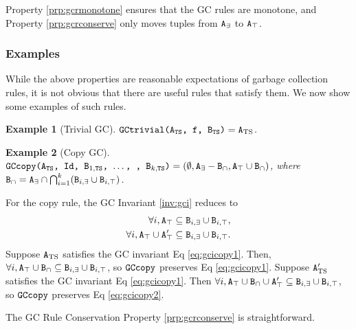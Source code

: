 \documentclass[10pt]{proc}
\numberwithin{equation}{section}
\newtheorem{example}{Example}[section]
\renewcommand{\tt}[1]{\ifmmode\text{\texttt{#1}}\else\texttt{#1}\fi}
\begin{document}
Property \ref{prp:gcrmonotone} ensures that the GC rules are monotone, and Property \ref{prp:gcrconserve} only moves tuples from $\tt{A}_\exists$ to $\tt{A}_\top$.

\subsubsection{Examples}
While the above properties are reasonable expectations of garbage collection rules, it is not obvious that there are useful rules that satisfy them.
We now show some examples of such rules.

\begin{example}[Trivial GC]
$\tt{GCtrivial(A$_\text{TS}$, f, B$_\text{TS}$)} = \tt{A}_\text{TS}$.
\end{example}

\begin{example}[Copy GC]
$\tt{GCcopy(A$_\text{TS}$, Id, B$_{1,\text{TS}}$, $\dots$, , B$_{k,\text{TS}}$)} = (\emptyset, \tt{A}_\exists - \tt{B}_\cap, \tt{A}_\top \cup \tt{B}_\cap)$, where $\tt{B}_\cap = \tt{A}_\exists \cap \bigcap_{i=1}^k (\tt{B}_{i,\exists} \cup \tt{B}_{i,\top})$.
\end{example}

For the copy rule, the GC Invariant \ref{inv:gci} reduces to 
\begin{align}
\forall i, \tt{A}_\top &\subseteq \tt{B}_{i,\exists} \cup \tt{B}_{i,\top},\label{eq:gcicopy1}\\
\forall i, \tt{A}_\top \cup \tt{A}_\top' &\subseteq \tt{B}_{i,\exists} \cup \tt{B}_{i,\top}.\label{eq:gcicopy2}
\end{align}
Suppose $\tt{A}_\text{TS}$ satisfies the GC invariant Eq \eqref{eq:gcicopy1}.
Then, $\forall i, \tt{A}_\top \cup \tt{B}_\cap \subseteq \tt{B}_{i,\exists} \cup \tt{B}_{i,\top}$, so $\tt{GCcopy}$ preserves Eq \eqref{eq:gcicopy1}.
Suppose $\tt{A}_\text{TS}'$ satisfies the GC invariant Eq \eqref{eq:gcicopy1}.
Then $\forall i, \tt{A}_\top \cup \tt{B}_\cap \cup \tt{A}_\top' \subseteq \tt{B}_{i,\exists} \cup \tt{B}_{i,\top}$, so $\tt{GCcopy}$ preserves Eq \eqref{eq:gcicopy2}.

The GC Rule Conservation Property \ref{prp:gcrconserve} is straightforward.
\end{document}
